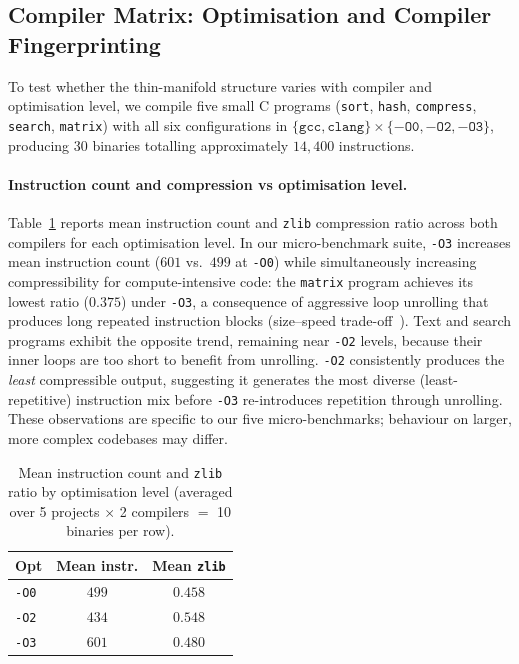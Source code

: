 \documentclass[10pt,twocolumn]{article}
\newcommand{\zlib}{\texttt{zlib}}
\begin{document}
\subsection{Compiler Matrix: Optimisation and Compiler Fingerprinting}
\label{sec:compiler_matrix}

To test whether the thin-manifold structure varies with compiler and
optimisation level, we compile five small C programs
(\texttt{sort}, \texttt{hash}, \texttt{compress}, \texttt{search},
\texttt{matrix}) with all six configurations in
$\{\mathtt{gcc}, \mathtt{clang}\} \times \{-\mathtt{O0}, -\mathtt{O2},
-\mathtt{O3}\}$, producing 30 binaries totalling approximately $14{,}400$
instructions.

\paragraph{Instruction count and compression vs optimisation level.}
Table~\ref{tab:compiler_matrix} reports mean instruction count and
\zlib{} compression ratio across both compilers for each optimisation level.
In our micro-benchmark suite, \texttt{-O3} increases mean instruction count
($601$ vs.\ $499$ at \texttt{-O0}) while simultaneously increasing
compressibility for compute-intensive code: the \texttt{matrix} program
achieves its lowest ratio ($0.375$) under \texttt{-O3}, a consequence of
aggressive loop unrolling that produces long repeated instruction blocks
(size--speed trade-off~\cite{agner2024optimizing}).  Text and search programs
exhibit the opposite trend, remaining near \texttt{-O2} levels, because
their inner loops are too short to benefit from unrolling.
\texttt{-O2} consistently produces the \emph{least} compressible output,
suggesting it generates the most diverse (least-repetitive) instruction mix
before \texttt{-O3} re-introduces repetition through unrolling.
These observations are specific to our five micro-benchmarks; behaviour on
larger, more complex codebases may differ.

\begin{table}[h]
\centering
\caption{Mean instruction count and \zlib{} ratio by optimisation level
  (averaged over 5 projects $\times$ 2 compilers $=$ 10 binaries per row).}
\label{tab:compiler_matrix}
\small
\begin{tabular}{@{}lcc@{}}
\toprule
\textbf{Opt} & \textbf{Mean instr.} & \textbf{Mean \zlib{}} \\
\midrule
\texttt{-O0} & $499$ & $0.458$ \\
\texttt{-O2} & $434$ & $0.548$ \\
\texttt{-O3} & $601$ & $0.480$ \\
\bottomrule
\end{tabular}
\end{table}
\end{document}
